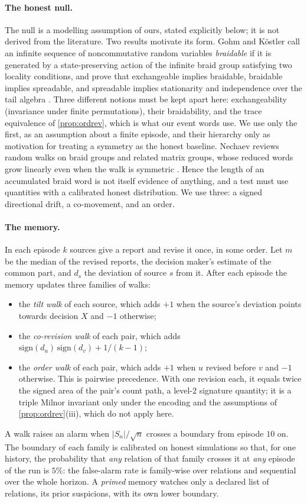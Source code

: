 \documentclass[11pt]{article}
\theoremstyle{definition}\newtheorem{definition}[theorem]{Definition}\newtheorem{remark}[theorem]{Remark}\newtheorem{example}[theorem]{Example}\newtheorem{problem}[theorem]{Open problem}\crefname{problem}{Problem}{Problems}
\begin{document}
\paragraph{The honest null.} The null is a modelling assumption of ours, stated explicitly below; it is not derived from the literature. Two results motivate its form. Gohm and K\"ostler call an infinite sequence of noncommutative random variables \emph{braidable} if it is generated by a state-preserving action of the infinite braid group satisfying two locality conditions, and prove that exchangeable implies braidable, braidable implies spreadable, and spreadable implies stationarity and independence over the tail algebra \cite{GohmKostler2009}. Three different notions must be kept apart here: exchangeability (invariance under finite permutations), their braidability, and the trace equivalence of \cref{prop:ordrev}, which is what our event words use. We use only the first, as an assumption about a finite episode, and their hierarchy only as motivation for treating a symmetry as the honest baseline. Nechaev reviews random walks on braid groups and related matrix groups, whose reduced words grow linearly even when the walk is symmetric \cite{Nechaev1998}. Hence the length of an accumulated braid word is not itself evidence of anything, and a test must use quantities with a calibrated honest distribution. We use three: a signed directional drift, a co-movement, and an order.

\paragraph{The memory.} In each episode $k$ sources give a report and revise it once, in some order. Let $m$ be the median of the revised reports, the decision maker's estimate of the common part, and $d_s$ the deviation of source $s$ from it. After each episode the memory updates three families of walks:
\begin{itemize}
\item the \emph{tilt walk} of each source, which adds $+1$ when the source's deviation points towards decision $X$ and $-1$ otherwise;
\item the \emph{co-revision walk} of each pair, which adds $\mathrm{sign}(d_u)\,\mathrm{sign}(d_v)+1/(k-1)$;
\item the \emph{order walk} of each pair, which adds $+1$ when $u$ revised before $v$ and $-1$ otherwise. This is pairwise precedence. With one revision each, it equals twice the signed area of the pair's count path, a level-2 signature quantity; it is a triple Milnor invariant only under the encoding and the assumptions of \cref{prop:ordrev}(iii), which do not apply here.
\end{itemize}
A walk raises an alarm when $|S_n|/\sqrt n$ crosses a boundary from episode $10$ on. The boundary of each family is calibrated on honest simulations so that, for one history, the probability that \emph{any} relation of that family crosses it at \emph{any} episode of the run is $5\%$: the false-alarm rate is family-wise over relations and sequential over the whole horizon. A \emph{primed} memory watches only a declared list of relations, its prior suspicions, with its own lower boundary.
\end{document}

